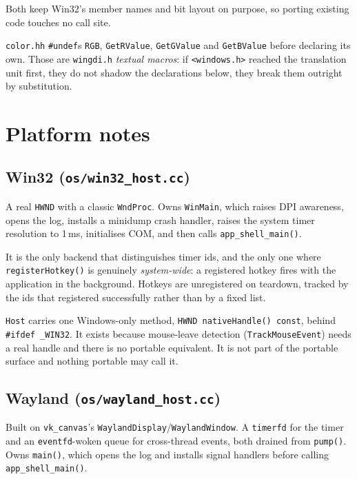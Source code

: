 \documentclass[11pt,a4paper]{article}
\begin{document}
Both keep Win32's member names and bit layout on purpose, so porting existing
code touches no call site.

\texttt{color.hh} \texttt{\#undef}s \texttt{RGB}, \texttt{GetRValue},
\texttt{GetGValue} and \texttt{GetBValue} before declaring its own. Those are
\texttt{wingdi.h} \emph{textual macros}: if \texttt{<windows.h>} reached the
translation unit first, they do not shadow the declarations below, they break
them outright by substitution.

\section{Platform notes}

\subsection{Win32 (\texttt{os/win32\_host.cc})}

A real \texttt{HWND} with a classic \texttt{WndProc}. Owns \texttt{WinMain},
which raises DPI awareness, opens the log, installs a minidump crash handler,
raises the system timer resolution to 1\,ms, initialises COM, and then calls
\texttt{app\_shell\_main()}.

It is the only backend that distinguishes timer ids, and the only one where
\texttt{registerHotkey()} is genuinely \emph{system-wide}: a registered hotkey
fires with the application in the background. Hotkeys are unregistered on
teardown, tracked by the ids that registered successfully rather than by a
fixed list.

\texttt{Host} carries one Windows-only method,
\texttt{HWND~nativeHandle()~const}, behind \texttt{\#ifdef~\_WIN32}. It exists because mouse-leave detection
(\texttt{TrackMouseEvent}) needs a real handle and there is no portable
equivalent. It is not part of the portable surface and nothing portable may call
it.

\subsection{Wayland (\texttt{os/wayland\_host.cc})}

Built on \texttt{vk\_canvas}'s \texttt{WaylandDisplay}/\texttt{WaylandWindow}. A
\texttt{timerfd} for the timer and an \texttt{eventfd}-woken queue for
cross-thread events, both drained from \texttt{pump()}. Owns \texttt{main()},
which opens the log and installs signal handlers before calling
\texttt{app\_shell\_main()}.
\end{document}
